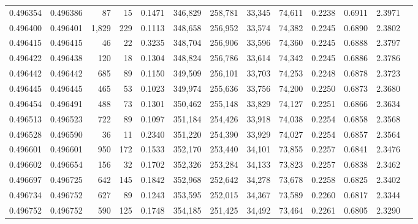 \begin{tabular}{rrrrrrrrrrrrr}
0.496354 & 0.496386 &    87 &    15 &                                     0.1471 & 346,829 & 258,781 &  33,345 &  74,611 & 0.2238 & 0.6911 & 2.3971 \\
0.496400 & 0.496401 & 1,829 &   229 &                                     0.1113 & 348,658 & 256,952 &  33,574 &  74,382 & 0.2245 & 0.6890 & 2.3802 \\
0.496415 & 0.496415 &    46 &    22 &                                     0.3235 & 348,704 & 256,906 &  33,596 &  74,360 & 0.2245 & 0.6888 & 2.3797 \\
0.496422 & 0.496438 &   120 &    18 &                                     0.1304 & 348,824 & 256,786 &  33,614 &  74,342 & 0.2245 & 0.6886 & 2.3786 \\
0.496442 & 0.496442 &   685 &    89 &                                     0.1150 & 349,509 & 256,101 &  33,703 &  74,253 & 0.2248 & 0.6878 & 2.3723 \\
0.496445 & 0.496445 &   465 &    53 &                                     0.1023 & 349,974 & 255,636 &  33,756 &  74,200 & 0.2250 & 0.6873 & 2.3680 \\
0.496454 & 0.496491 &   488 &    73 &                                     0.1301 & 350,462 & 255,148 &  33,829 &  74,127 & 0.2251 & 0.6866 & 2.3634 \\
0.496513 & 0.496523 &   722 &    89 &                                     0.1097 & 351,184 & 254,426 &  33,918 &  74,038 & 0.2254 & 0.6858 & 2.3568 \\
0.496528 & 0.496590 &    36 &    11 &                                     0.2340 & 351,220 & 254,390 &  33,929 &  74,027 & 0.2254 & 0.6857 & 2.3564 \\
0.496601 & 0.496601 &   950 &   172 &                                     0.1533 & 352,170 & 253,440 &  34,101 &  73,855 & 0.2257 & 0.6841 & 2.3476 \\
0.496602 & 0.496654 &   156 &    32 &                                     0.1702 & 352,326 & 253,284 &  34,133 &  73,823 & 0.2257 & 0.6838 & 2.3462 \\
0.496697 & 0.496725 &   642 &   145 &                                     0.1842 & 352,968 & 252,642 &  34,278 &  73,678 & 0.2258 & 0.6825 & 2.3402 \\
0.496734 & 0.496752 &   627 &    89 &                                     0.1243 & 353,595 & 252,015 &  34,367 &  73,589 & 0.2260 & 0.6817 & 2.3344 \\
0.496752 & 0.496752 &   590 &   125 &                                     0.1748 & 354,185 & 251,425 &  34,492 &  73,464 & 0.2261 & 0.6805 & 2.3290 \\

\end{tabular}
